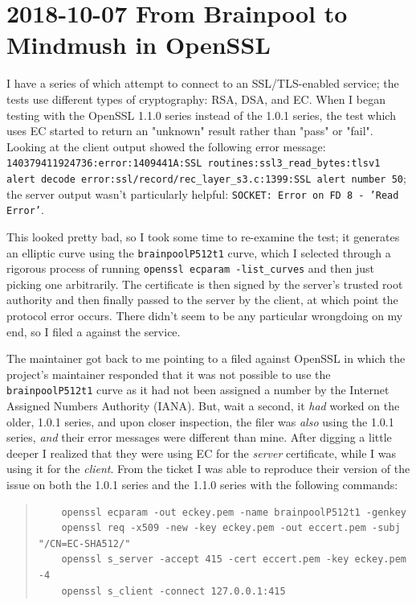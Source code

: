 \documentclass{article}
\begin{document}
\section{2018-10-07 From Brainpool to Mindmush in OpenSSL}
I have a series of  which attempt to connect to an SSL/TLS-enabled service; the tests use different types of cryptography: RSA, DSA, and EC.  When I began testing with the OpenSSL 1.1.0 series instead of the 1.0.1 series, the test which uses EC started to return an "unknown" result rather than "pass" or "fail".  Looking at the client output showed the following error message: \texttt{140379411924736:error:1409441A:SSL routines:ssl3_read_bytes:tlsv1 alert decode error:ssl/record/rec_layer_s3.c:1399:SSL alert number 50}; the server output wasn't particularly helpful: \texttt{SOCKET: Error on FD 8 - 'Read Error'}.

This looked pretty bad, so I took some time to re-examine the test; it generates an elliptic curve using the \texttt{brainpoolP512t1} curve, which I selected through a rigorous process of running \texttt{openssl ecparam -list_curves} and then just picking one arbitrarily.  The certificate is then signed by the server's trusted root authority and then finally passed to the server by the client, at which point the protocol error occurs.  There didn't seem to be any particular wrongdoing on my end, so I filed a  against the service.

The maintainer got back to me pointing to a  filed against OpenSSL in which the project's maintainer responded that it was not possible to use the \texttt{brainpoolP512t1} curve as it had not been assigned a number by the Internet Assigned Numbers Authority (IANA).  But, wait a second, it \emph{had} worked on the older, 1.0.1 series, and upon closer inspection, the filer was \emph{also} using the 1.0.1 series, \emph{and} their error messages were different than mine.  After digging a little deeper I realized that they were using EC for the \emph{server} certificate, while I was using it for the \emph{client}.  From the ticket I was able to reproduce their version of the issue on both the 1.0.1 series and the 1.1.0 series with the following commands:

\begin{quote}
\begin{verbatim}
	openssl ecparam -out eckey.pem -name brainpoolP512t1 -genkey
	openssl req -x509 -new -key eckey.pem -out eccert.pem -subj "/CN=EC-SHA512/"
	openssl s_server -accept 415 -cert eccert.pem -key eckey.pem -4
	openssl s_client -connect 127.0.0.1:415
\end{verbatim}
\end{quote}
\end{document}
